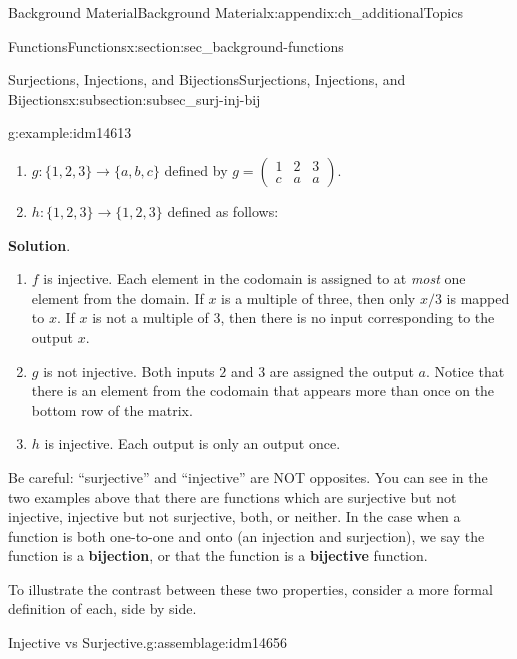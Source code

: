\documentclass[oneside,10pt,]{book}
\newcommand{\terminology}[1]{\textbf{#1}}
\numberwithin{equation}{chapter}
\newcommand{\amp}{&}
\begin{document}
\begin{appendixptx}{Background Material}{}{Background Material}{}{}{x:appendix:ch_additionalTopics}
\begin{sectionptx}{Functions}{}{Functions}{}{}{x:section:sec_background-functions}
\begin{subsectionptx}{Surjections, Injections, and Bijections}{}{Surjections, Injections, and Bijections}{}{}{x:subsection:subsec_surj-inj-bij}
\begin{example}{}{g:example:idm14613}
\begin{enumerate}
\item{}\(g: \{1,2,3\} \to \{a,b,c\}\) defined by \(g = \begin{pmatrix}1 \amp 2 \amp 3 \\ c \amp a \amp a \end{pmatrix}\).%
\item{}\(h:\{1,2,3\} \to \{1,2,3\}\) defined as follows:%
\begin{sidebyside}{1}{0.4}{0.4}{0}%
\begin{sbspanel}{0.2}%
%
\end{sbspanel}%
\end{sidebyside}%
\end{enumerate}
%
\par\smallskip%
\noindent\textbf{Solution}.\hypertarget{g:solution:idm14630}{}\quad{}%
\begin{enumerate}
\item{}\(f\) is injective. Each element in the codomain is assigned to at \emph{most} one element from the domain. If \(x\) is a multiple of three, then only \(x/3\) is mapped to \(x\). If \(x\) is not a multiple of 3, then there is no input corresponding to the output \(x\).%
\item{}\(g\) is not injective. Both inputs \(2\) and \(3\) are assigned the output \(a\). Notice that there is an element from the codomain that appears more than once on the bottom row of the matrix.%
\item{}\(h\) is injective. Each output is only an output once.%
\end{enumerate}
%
\end{example}
Be careful: ``surjective'' and ``injective'' are NOT opposites.  You can see in the two examples above that there are functions which are surjective but not injective, injective but not surjective, both, or neither. In the case when a function is both one-to-one and onto (an injection and surjection), we say the function is a \terminology{bijection}, or that the function is a \terminology{bijective} function.%
\par
To illustrate the contrast between these two properties, consider a more formal definition of each, side by side.%
\begin{assemblage}{Injective vs Surjective.}{g:assemblage:idm14656}%

\end{assemblage}
\end{subsectionptx}
\end{sectionptx}
\end{appendixptx}
\end{document}
